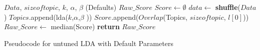 \documentclass[10pt,conference]{IEEEtran}
\theoremstyle{break}
\begin{document}
\makeatletter
\algrenewcommand\ALG@beginalgorithmic{\footnotesize}
\algrenewcommand{}
\makeatother
\renewcommand{\algorithmicrequire}{\textbf{Input:}}
\renewcommand{\algorithmicensure}{\textbf{Output:}}
\begin{algorithm}[!t]
    
    \begin{algorithmic}[1]
    \Require $Data$, $\mathit{size of topic}$, $k$, $\alpha$, $\beta$ (Defaults) 
    \Ensure $Raw\_Score$    
        \State $Score \leftarrow \emptyset$
                \State $data \leftarrow$ \textbf{shuffle}($Data$)
                \State $Topics$.append(lda($k$,$\alpha$,$\beta$ ))
            \EndFor
            \State $Score$.append($Overlap$(Topics, $\mathit{size of topic}$, $l[0]$))
        \EndFor
        \State $Raw\_Score \leftarrow $ median(Score)
        \State \textbf{return} $Raw\_Score$
    \EndFunction
    \caption{Pseudocode for untuned LDA with Default Parameters}
    \end{algorithmic}
\end{algorithm}
\end{document}
